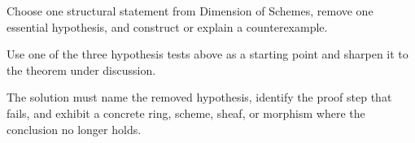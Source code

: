 \begin{exercise}\label{exr:vi30-expand-16}
Choose one structural statement from Dimension of Schemes, remove one essential hypothesis, and construct or explain a counterexample.
\end{exercise}
\begin{hint}
Use one of the three hypothesis tests above as a starting point and sharpen it to the theorem under discussion.
\end{hint}
\begin{solution}
The solution must name the removed hypothesis, identify the proof step that fails, and exhibit a concrete ring, scheme, sheaf, or morphism where the conclusion no longer holds.
\end{solution}

